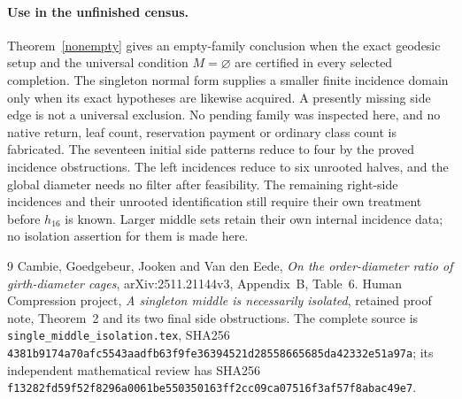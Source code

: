 \documentclass[11pt]{article}
\begin{document}
\paragraph{Use in the unfinished census.}
Theorem~\ref{nonempty} gives an empty-family conclusion when the exact
geodesic setup and the universal condition $M=\varnothing$ are certified
in every selected completion. The singleton normal form supplies a
smaller finite incidence domain only when its exact hypotheses are
likewise acquired. A presently missing side edge is not a universal
exclusion. No pending family was inspected here, and no native return,
leaf count, reservation payment or ordinary class count is fabricated.
The seventeen initial side patterns reduce to four by the proved
incidence obstructions. The left incidences reduce to six unrooted
halves, and the global diameter needs no filter after feasibility.
The remaining right-side incidences and their unrooted identification
still require their own treatment before $h_{16}$ is known. Larger middle sets retain their own internal
incidence data; no isolation assertion for them is made here.

\begin{thebibliography}{9}
 Cambie, Goedgebeur, Jooken and Van den Eede,
\emph{On the order-diameter ratio of girth-diameter cages},
arXiv:2511.21144v3, Appendix~B, Table~6.
 Human Compression project,
\emph{A singleton middle is necessarily isolated}, retained proof note,
Theorem~2 and its two final side obstructions.
The complete source is \texttt{single\_middle\_isolation.tex},
SHA256 \texttt{4381b9174a70afc5543aadfb63f9fe36394521d28558665685da42332e51a97a};
its independent mathematical review has SHA256
\texttt{f13282fd59f52f8296a0061be550350163ff2cc09ca07516f3af57f8abac49e7}.
\end{thebibliography}
\end{document}
